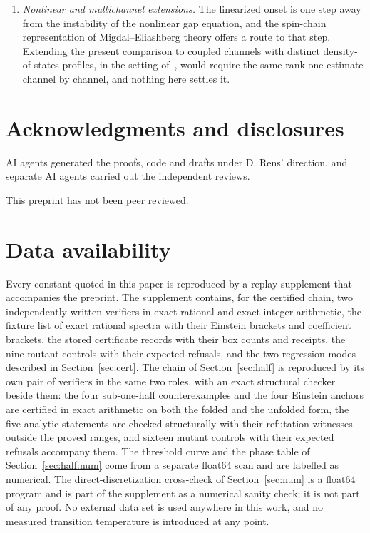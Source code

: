 \documentclass[11pt]{article}
\newcommand{\kb}{k_{\mathrm B}}
\newcommand{\Tlin}{T_{\mathrm{lin}}}
\theoremstyle{definition}
\theoremstyle{remark}
\begin{document}
\begin{enumerate}[label=(\arabic*),leftmargin=2.2em]
stability form keeps $\kb\Tlin\le C(\lambda)\sqrt M$. A kernel that also modifies $Z$ does
not, and the common-cutoff optimality question for that class is not posed here.
\item \emph{Nonlinear and multichannel extensions.} The linearized onset is one step away
from the instability of the nonlinear gap equation, and the spin-chain representation of
Migdal--Eliashberg theory offers a route to that step. Extending the present comparison to
coupled channels with distinct density-of-states profiles, in the setting
of~\cite{univglue,optimum,anisosharp,capstone}, would require the same rank-one estimate
channel by channel, and nothing here settles it.
\end{enumerate}

\section*{Acknowledgments and disclosures}

AI agents generated the proofs, code and drafts under D. Rens' direction, and separate AI
agents carried out the independent reviews.

This preprint has not been peer reviewed.

\section*{Data availability}

Every constant quoted in this paper is reproduced by a replay supplement that accompanies
the preprint. The supplement contains, for the certified chain, two independently written
verifiers in exact rational and exact integer arithmetic, the fixture list of exact
rational spectra with their Einstein brackets and coefficient brackets, the stored
certificate records with their box counts and receipts, the nine mutant controls with
their expected refusals, and the two regression modes described in
Section~\ref{sec:cert}. The chain of Section~\ref{sec:half} is reproduced by its own pair
of verifiers in the same two roles, with an exact structural checker beside them: the four
sub-one-half counterexamples and the
four Einstein anchors are certified in exact arithmetic on both the folded and the unfolded
form, the five analytic statements are checked structurally with their refutation witnesses
outside the proved ranges, and sixteen mutant controls with their expected refusals
accompany them. The threshold curve and the phase table of Section~\ref{sec:half:num} come
from a separate float64 scan and are labelled as numerical. The
direct-discretization cross-check of Section~\ref{sec:num} is a float64 program and is part
of the supplement as a numerical sanity check; it is not part of any proof. No external
data set is used anywhere in this work, and no measured transition temperature is
introduced at any point.



\end{document}
